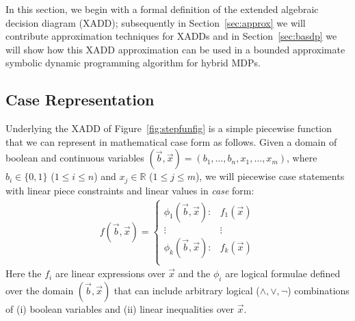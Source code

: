 \label{sec:xadd}

In this section, we begin with a formal definition of the extended
algebraic decision diagram (XADD); subsequently in
Section~\ref{sec:approx} we will contribute approximation techniques
for XADDs and in Section~\ref{sec:basdp} we will show how this XADD
approximation can be used in a bounded approximate symbolic dynamic
programming algorithm for hybrid MDPs.

\subsection{Case Representation}


Underlying the XADD of Figure~\ref{fig:stepfunfig} is a simple
piecewise function that we can represent in mathematical case form as
follows.  Given a domain of boolean and continuous variables
$(\vec{b},\vec{x}) = ( b_1,\ldots,b_n,x_{1},\ldots,x_m )$, where
$b_i \in \{ 0,1 \}$ ($1 \leq i \leq n$) and $x_j \in \mathbb{R}$
($1 \leq j \leq m$), we will piecewise case statements with linear
piece constraints and linear values in \emph{case} form:
{%
\begin{align}
f(\vec{b},\vec{x}) = 
\begin{cases}
  \phi_1(\vec{b},\vec{x}): & f_1(\vec{x}) \\ 
 \vdots&\vdots\\ 
  \phi_k(\vec{b},\vec{x}): & f_k(\vec{x}) \\ 
\end{cases} \label{eq:case}
\end{align}
} 
Here the $f_i$ are linear expressions over $\vec{x}$ and the $\phi_i$
are logical formulae defined over the domain $(\vec{b},\vec{x})$ that
can include arbitrary logical ($\land,\lor,\neg$) combinations of (i)
boolean variables and (ii) linear inequalities over $\vec{x}$.

%

